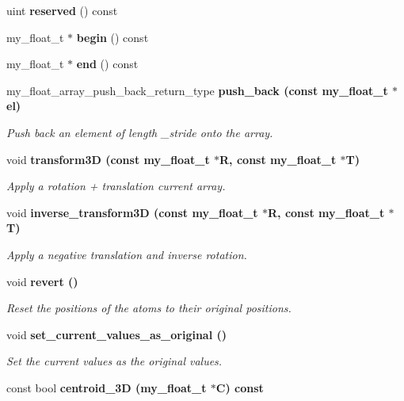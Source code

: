 \begin{CompactItemize}
\item 
uint \textbf{reserved} () const \label{classSimSite3D_1_1my__float__array_ad39c32e4901faa77e113451f3292cd5}

\item 
my\_\-float\_\-t $\ast$ \textbf{begin} () const \label{classSimSite3D_1_1my__float__array_764b70c62326d6ed689ecc3fdce08c5a}

\item 
my\_\-float\_\-t $\ast$ \textbf{end} () const \label{classSimSite3D_1_1my__float__array_62e4444b755858beec023de8d9fceeef}

\item 
my\_\-float\_\-array\_\-push\_\-back\_\-return\_\-type \bf{push\_\-back} (const my\_\-float\_\-t $\ast$el)
\begin{CompactList}\small\item\em Push back an element of length \_\-stride onto the array. \item\end{CompactList}\item 
void \bf{transform3D} (const my\_\-float\_\-t $\ast$R, const my\_\-float\_\-t $\ast$T)
\begin{CompactList}\small\item\em Apply a rotation + translation current array. \item\end{CompactList}\item 
void \bf{inverse\_\-transform3D} (const my\_\-float\_\-t $\ast$R, const my\_\-float\_\-t $\ast$T)
\begin{CompactList}\small\item\em Apply a negative translation and inverse rotation. \item\end{CompactList}\item 
void \bf{revert} ()\label{classSimSite3D_1_1my__float__array_5612962a30bbc36661eab21d94a172a7}

\begin{CompactList}\small\item\em Reset the positions of the atoms to their original positions. \item\end{CompactList}\item 
void \bf{set\_\-current\_\-values\_\-as\_\-original} ()
\begin{CompactList}\small\item\em Set the current values as the original values. \item\end{CompactList}\item 
const bool \bf{centroid\_\-3D} (my\_\-float\_\-t $\ast$C) const \label{classSimSite3D_1_1my__float__array_c716853fd605ff6e32d4ede02cedb7b0}


\end{CompactItemize}
